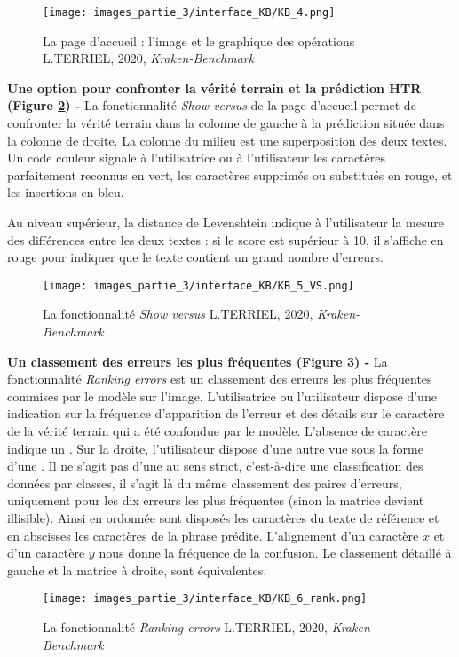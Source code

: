 \begin{figure}[H]
    \centering
    \texttt{[image: images\_partie\_3/interface\_KB/KB\_4.png]}
        \caption{La page d'accueil : l'image et le graphique des opérations \textcopyright L.TERRIEL, 2020, \textit{Kraken-Benchmark}}
        \label{fig:accueil_KB_2}
\end{figure}
\newpage
\textbf{Une option pour confronter la vérité terrain et la prédiction HTR (Figure \ref{fig:accueil_KB_3}) - } La fonctionnalité \textit{Show versus} de la page d'accueil permet de confronter la vérité terrain dans la colonne de gauche à la prédiction située dans la colonne de droite. La colonne du milieu est une superposition des deux textes. Un code couleur signale à l'utilisatrice ou à l'utilisateur les caractères parfaitement reconnus en vert, les caractères supprimés ou substitués en rouge, et les insertions en bleu. 

Au niveau supérieur, la distance de Levenshtein indique à l'utilisateur la mesure des différences entre les deux textes : si le score est supérieur à 10, il s'affiche en rouge pour indiquer que le texte contient un grand nombre d'erreurs.
\begin{figure}[H]
    \centering
    \texttt{[image: images\_partie\_3/interface\_KB/KB\_5\_VS.png]}
        \caption{La fonctionnalité \textit{Show versus} \textcopyright L.TERRIEL, 2020, \textit{Kraken-Benchmark}}
        \label{fig:accueil_KB_3}
\end{figure}
\bigskip

\textbf{Un classement des erreurs les plus fréquentes (Figure \ref{fig:accueil_KB_4}) - }  La fonctionnalité \textit{Ranking errors} est un classement des erreurs les plus fréquentes commises par le modèle sur l'image. L'utilisatrice ou l'utilisateur dispose d'une indication sur la fréquence d'apparition de l'erreur et des détails sur le caractère de la vérité terrain qui a été confondue par le modèle. L'absence de caractère indique un . Sur la droite, l'utilisateur dispose d'une autre vue sous la forme d'une . Il ne s'agit pas d'une  au sens strict, c'est-à-dire une classification des données par classes, il s'agit là du même classement des paires d'erreurs, uniquement pour les dix erreurs les plus fréquentes (sinon la matrice devient illisible). \newpage Ainsi en ordonnée sont disposés les caractères du texte de référence et en abscisses les caractères de la phrase prédite. L'alignement d'un caractère $x$ et d'un caractère $y$ nous donne la fréquence de la confusion. Le classement détaillé à gauche et la matrice à droite, sont équivalentes. 
\begin{figure}[H]
    \centering
    \texttt{[image: images\_partie\_3/interface\_KB/KB\_6\_rank.png]}
        \caption{La fonctionnalité \textit{Ranking errors} \textcopyright L.TERRIEL, 2020, \textit{Kraken-Benchmark}}
        \label{fig:accueil_KB_4}
\end{figure}
\bigskip

